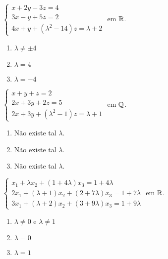 \documentclass[12pt]{exam}
\begin{document}
\begin{exercicio}
    $
        \begin{cases}
            x + 2y - 3z = 4\\
            3x - y + 5z = 2\\
            4x + y + (\lambda^2 - 14)z = \lambda + 2
        \end{cases}
    $
    em $\mathbb{R}$.
    \begin{solucao}
        \begin{enumerate}[label={\alph*})]
            \item $\lambda \ne \pm 4$

            \item $\lambda = 4$

            \item $\lambda = -4$
    \end{enumerate}
  \end{solucao}
\end{exercicio}

\begin{exercicio}
    $
        \begin{cases}
            x + y + z = 2\\
            2x + 3y + 2z = 5\\
            2x + 3y + (\lambda^2 - 1)z = \lambda + 1
        \end{cases}
    $
    em $\mathbb{Q}$.
    \begin{solucao}
        \begin{enumerate}[label={\alph*})]
            \item Não existe tal $\lambda$.

            \item Não existe tal $\lambda$.

            \item Não existe tal $\lambda$.
        \end{enumerate}
    \end{solucao}
\end{exercicio}

\begin{exercicio}
    $
        \begin{cases}
            x_1 + \lambda x_2 + (1 + 4\lambda )x_3 = 1 + 4\lambda \\
            2x_1 + (\lambda  + 1)x_2 + (2 + 7\lambda )x_3 = 1 + 7\lambda \\
            3x_1 + (\lambda  + 2)x_2 + (3 + 9\lambda )x_3 = 1 + 9\lambda
        \end{cases}
    $
    em $\mathbb{R}$.
    \begin{solucao}
        \begin{enumerate}[label={\alph*})]
            \item $\lambda \ne 0$ e $\lambda \ne 1$

            \item $\lambda = 0$

            \item $\lambda = 1$
        \end{enumerate}
    \end{solucao}
\end{exercicio}
\end{document}
